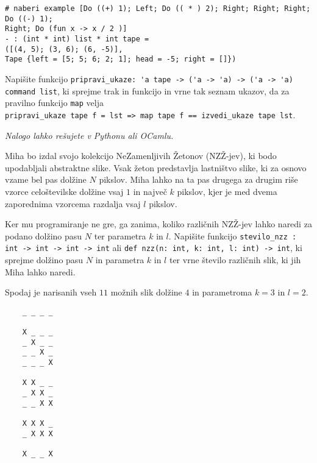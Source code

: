 \documentclass[arhiv]{../izpit}
\begin{document}
\begin{verbatim}
# naberi example [Do ((+) 1); Left; Do (( * ) 2); Right; Right; Right; Do ((-) 1); 
Right; Do (fun x -> x / 2 )]
- : (int * int) list * int tape =
([(4, 5); (3, 6); (6, -5)],
Tape {left = [5; 5; 6; 2; 1]; head = -5; right = []})
\end{verbatim}

\podnaloga
Napišite funkcijo \verb|pripravi_ukaze: 'a tape -> ('a -> 'a) -> ('a -> 'a) command list|, ki sprejme trak in funkcijo in vrne tak seznam ukazov, da za pravilno funkcijo \verb|map| velja \\
\verb|pripravi_ukaze tape f = lst => map tape f == izvedi_ukaze tape lst|.



\naloga

\emph{Nalogo lahko rešujete v Pythonu ali OCamlu.}

Miha bo izdal svojo kolekcijo NeZamenljivih Žetonov (NZŽ-jev), ki bodo upodabljali abstraktne slike.
Vsak žeton predstavlja lastništvo slike, ki za osnovo vzame bel pas dolžine $N$ pikslov. 
Miha lahko na ta pas drugega za drugim riše vzorce celoštevilske dolžine vsaj $1$ in največ $k$ pikslov, kjer je med dvema zaporednima vzorcema razdalja vsaj $l$ pikslov.

  Ker mu programiranje ne gre, ga zanima, koliko različnih NZŽ-jev lahko naredi za podano dolžino pasu $N$ ter parametra $k$ in $l$.
  Napišite funkcijo \verb|stevilo_nzz : int -> int -> int -> int| ali \verb|def nzz(n: int, k: int, l: int) -> int|, ki sprejme dolžino pasu $N$ in parametra $k$ in $l$ ter vrne število različnih slik, ki jih Miha lahko naredi.

  Spodaj je narisanih vseh $11$ možnih slik dolžine $4$ in parametroma $k = 3$ in $l = 2$.
\begin{verbatim}
    _ _ _ _
    
    X _ _ _
    _ X _ _
    _ _ X _
    _ _ _ X
    
    X X _ _
    _ X X _
    _ _ X X
    
    X X X _
    _ X X X
    
    X _ _ X
\end{verbatim}
\end{document}
